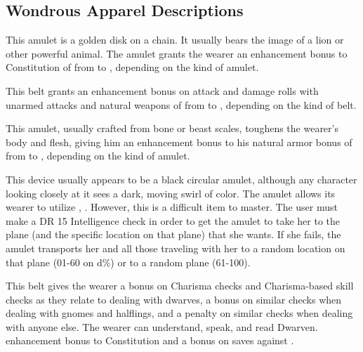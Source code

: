 \subsection{Wondrous Apparel Descriptions}

 This amulet is a golden disk on a chain. It usually bears the image of a lion or other powerful animal. The amulet grants the wearer an enhancement bonus to Constitution of from  to , depending on the kind of amulet.

 This belt grants an enhancement bonus on attack and damage rolls with unarmed attacks and natural weapons of from  to , depending on the kind of belt.

 This amulet, usually crafted from bone or beast scales, toughens the wearer's body and flesh, giving him an enhancement bonus to his natural armor bonus of from  to , depending on the kind of amulet.

 This device usually appears to be a black circular amulet, although any character looking closely at it sees a dark, moving swirl of color. The amulet allows its wearer to utilize , . However, this is a difficult item to master. The user must make a DR 15 Intelligence check in order to get the amulet to take her to the plane (and the specific location on that plane) that she wants. If she fails, the amulet transports her and all those traveling with her to a random location on that plane (01-60 on d\%) or to a random plane (61-100). 

 This belt gives the wearer a   bonus on Charisma checks and Charisma-based skill checks as they relate to dealing with dwarves, a   bonus on similar checks when dealing with gnomes and halflings, and a  penalty on similar checks when dealing with anyone else. The wearer can understand, speak, and read Dwarven.   enhancement bonus to Constitution and a   bonus on saves against .

